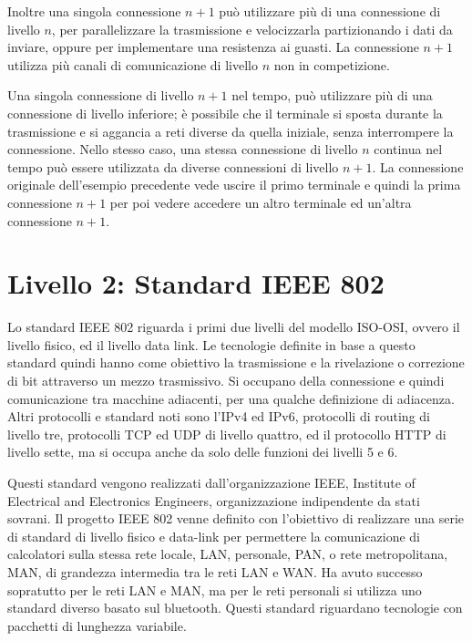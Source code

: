 \documentclass{article}
\numberwithin{equation}{subsection}
\begin{document}
Inoltre una singola connessione $n+1$ può utilizzare più di una connessione di livello $n$, per parallelizzare la trasmissione e velocizzarla partizionando i dati da 
inviare, oppure per implementare una resistenza ai guasti. La connessione $n+1$ utilizza più canali di comunicazione di livello $n$ non in competizione. 

Una singola connessione di livello $n+1$ nel tempo, può utilizzare più di una connessione di livello inferiore; è possibile che il terminale si sposta durante la 
trasmissione e si aggancia a reti diverse da quella iniziale, senza interrompere la connessione. 
Nello stesso caso, una stessa connessione di livello $n$ continua nel tempo può essere utilizzata da diverse connessioni di livello $n+1$. La connessione originale dell'esempio 
precedente vede uscire il primo terminale e quindi la prima connessione $n+1$ per poi vedere accedere un altro terminale ed un'altra connessione $n+1$. 

\clearpage

\section{Livello 2: Standard IEEE 802}


Lo standard IEEE 802 riguarda i primi due livelli del modello ISO-OSI, ovvero il livello fisico, ed il livello data link. Le tecnologie definite in base a questo standard quindi hanno come obiettivo la trasmissione 
e la rivelazione o correzione di bit attraverso un mezzo trasmissivo. Si occupano della connessione e quindi comunicazione tra macchine adiacenti, per una qualche definizione di adiacenza. Altri protocolli e standard 
noti sono l'IPv4 ed IPv6, protocolli di routing di livello tre, protocolli TCP ed UDP di livello quattro, ed il protocollo HTTP di livello sette, ma si occupa anche da solo delle funzioni dei livelli 5 e 6. 

Questi standard vengono realizzati dall'organizzazione IEEE, Institute of Electrical and Electronics Engineers, organizzazione indipendente da stati sovrani. Il progetto IEEE 802 venne definito con 
l'obiettivo di realizzare una serie di standard di livello fisico e data-link per permettere la comunicazione di calcolatori sulla stessa rete locale, LAN, personale, PAN, o rete metropolitana, MAN, di grandezza 
intermedia tra le reti LAN e WAN. Ha avuto successo sopratutto per le reti LAN e MAN, ma per le reti personali si utilizza uno standard diverso basato sul bluetooth. 
Questi standard riguardano tecnologie con pacchetti di lunghezza variabile.
\end{document}
